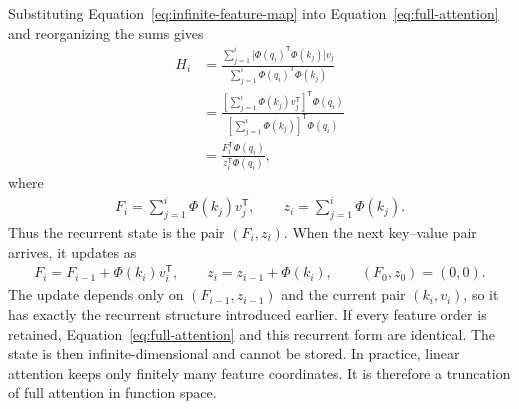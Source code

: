 \documentclass[11pt]{article}
\begin{document}
Substituting Equation~\eqref{eq:infinite-feature-map} into
Equation~\eqref{eq:full-attention} and reorganizing the sums gives
\begin{equation}
  \begin{split}
    H_i
    &=\frac{\sum_{j=1}^{i}
      \bigl[\Phi(q_i)^{\mathsf T}\Phi(k_j)\bigr]v_j}
      {\sum_{j=1}^{i}
      \Phi(q_i)^{\mathsf T}\Phi(k_j)}\\[3pt]
    &=\frac{
      \left[\sum_{j=1}^{i}\Phi(k_j)v_j^{\mathsf T}\right]^{\mathsf T}
      \Phi(q_i)}
      {\left[\sum_{j=1}^{i}\Phi(k_j)\right]^{\mathsf T}\Phi(q_i)}\\[3pt]
    &=\frac{F_i^{\mathsf T}\Phi(q_i)}
      {z_i^{\mathsf T}\Phi(q_i)},
  \label{eq:attention-recurrent-form}
  \end{split}
\end{equation}
where
\begin{equation}
  \begin{split}
  F_i=\sum_{j=1}^{i}\Phi(k_j)v_j^{\mathsf T},
  \qquad
  z_i=\sum_{j=1}^{i}\Phi(k_j).
  \end{split}
\end{equation}
Thus the recurrent state is the pair $(F_i,z_i)$.  When the next key--value
pair arrives, it updates as
\begin{equation}
  \begin{split}
  F_i=F_{i-1}+\Phi(k_i)v_i^{\mathsf T},
  \qquad
  z_i=z_{i-1}+\Phi(k_i),
  \qquad
  (F_0,z_0)=(0,0).
  \label{eq:moment-recurrence}
  \end{split}
\end{equation}
The update depends only on $(F_{i-1},z_{i-1})$ and the current pair $(k_i,v_i)$,
so it has exactly the recurrent structure introduced earlier.  If every
feature order is retained, Equation~\eqref{eq:full-attention} and this recurrent
form are identical.  The state is then infinite-dimensional and cannot be
stored.  In practice, linear attention keeps only finitely many feature
coordinates.  It is therefore a truncation of full attention in function
space.
\end{document}
